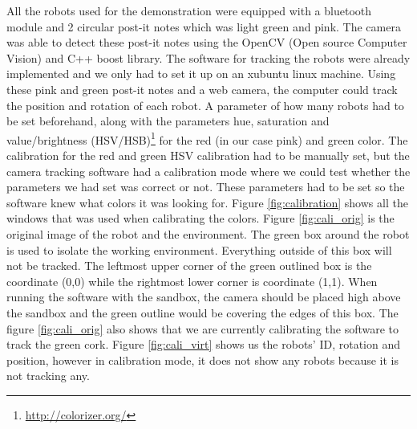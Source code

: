 All the robots used for the demonstration were equipped with a bluetooth module and 2 circular post-it notes which was light green and pink.
The camera was able to detect these post-it notes using the OpenCV (Open source Computer Vision) and C++ boost library. The software for tracking the robots were already implemented and we only had to set it up on an xubuntu linux machine.
Using these pink and green post-it notes and a web camera, the computer could track the position and rotation of each robot. A parameter of how many robots had to be set beforehand, along with the parameters hue, saturation and value/brightness (HSV/HSB)\footnote{\href{http://colorizer.org/}{http://colorizer.org/}} for the red (in our case pink) and green color. The calibration for the red and green HSV calibration had to be manually set, but the camera tracking software had a calibration mode where we could test whether the parameters we had set was correct or not. These parameters had to be set so the software knew what colors it was looking for.
Figure \ref{fig:calibration} shows all the windows that was used when calibrating the colors. Figure \ref{fig:cali_orig} is the original image of the robot and the environment. The green box around the robot is used to isolate the working environment. Everything outside of this box will not be tracked. The leftmost upper corner of the green outlined box is the coordinate (0,0) while the rightmost lower corner is coordinate (1,1). When running the software with the sandbox, the camera should be placed high above the sandbox and the green outline would be covering the edges of this box. The figure \ref{fig:cali_orig} also shows that we are currently calibrating the software to track the green cork. Figure \ref{fig:cali_virt} shows us the robots' ID, rotation and position, however in calibration mode, it does not show any robots because it is not tracking any.

